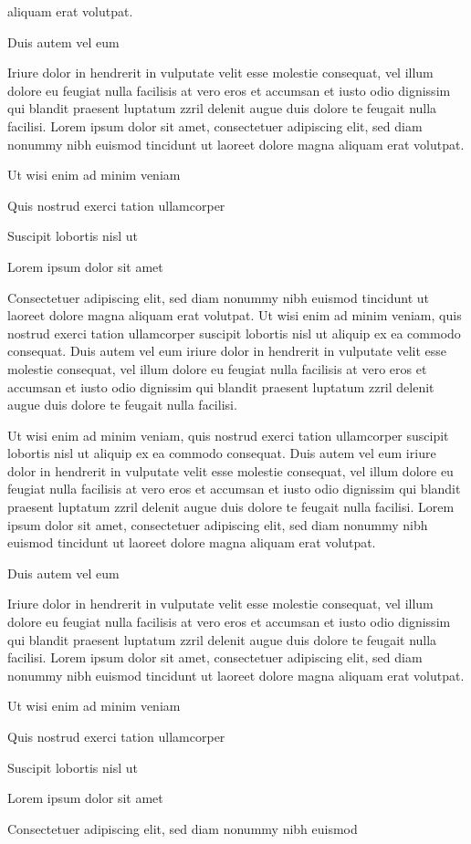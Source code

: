 \documentclass[11pt]{article}\makeatletter
\begin{document}
      aliquam erat volutpat. \par Duis autem vel eum \par Iriure dolor in hendrerit in vulputate velit esse molestie
      consequat, vel illum dolore eu feugiat nulla facilisis at vero eros et
      accumsan et iusto odio dignissim qui blandit praesent luptatum zzril
      delenit augue duis dolore te feugait nulla facilisi. Lorem ipsum dolor
      sit amet, consectetuer adipiscing elit, sed diam nonummy nibh euismod
      tincidunt ut laoreet dolore magna aliquam erat volutpat. \par Ut wisi enim ad minim veniam\par Quis nostrud exerci tation ullamcorper \par Suscipit lobortis nisl ut \par Lorem ipsum dolor sit amet\par Consectetuer adipiscing elit, sed diam nonummy nibh euismod
      tincidunt ut laoreet dolore magna aliquam erat volutpat. Ut wisi enim
      ad minim veniam, quis nostrud exerci tation ullamcorper suscipit
      lobortis nisl ut aliquip ex ea commodo consequat. Duis autem vel eum
      iriure dolor in hendrerit in vulputate velit esse molestie consequat,
      vel illum dolore eu feugiat nulla facilisis at vero eros et accumsan
      et iusto odio dignissim qui blandit praesent luptatum zzril delenit
      augue duis dolore te feugait nulla facilisi.\par Ut wisi enim ad minim veniam, quis nostrud exerci tation
      ullamcorper suscipit lobortis nisl ut aliquip ex ea commodo
      consequat. Duis autem vel eum iriure dolor in hendrerit in vulputate
      velit esse molestie consequat, vel illum dolore eu feugiat nulla
      facilisis at vero eros et accumsan et iusto odio dignissim qui blandit
      praesent luptatum zzril delenit augue duis dolore te feugait nulla
      facilisi. Lorem ipsum dolor sit amet, consectetuer adipiscing elit,
      sed diam nonummy nibh euismod tincidunt ut laoreet dolore magna
      aliquam erat volutpat. \par Duis autem vel eum \par Iriure dolor in hendrerit in vulputate velit esse molestie
      consequat, vel illum dolore eu feugiat nulla facilisis at vero eros et
      accumsan et iusto odio dignissim qui blandit praesent luptatum zzril
      delenit augue duis dolore te feugait nulla facilisi. Lorem ipsum dolor
      sit amet, consectetuer adipiscing elit, sed diam nonummy nibh euismod
      tincidunt ut laoreet dolore magna aliquam erat volutpat. \par Ut wisi enim ad minim veniam\par Quis nostrud exerci tation ullamcorper \par Suscipit lobortis nisl ut \par Lorem ipsum dolor sit amet\par Consectetuer adipiscing elit, sed diam nonummy nibh euismod
\end{document}
